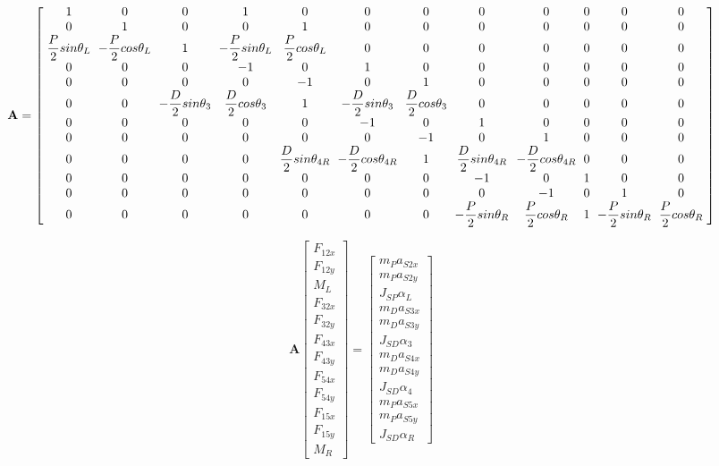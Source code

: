 \documentclass[12pt]{article}
\begin{document}
\scriptsize
\begin{equation}
\textbf{A}=
\begingroup %
\setlength\arraycolsep{3pt}
\left[
\begin{array}{cccccccccccc}
1 & 0 & 0 & 1 & 0 & 0 & 0 & 0 & 0 & 0 & 0 & 0 \\
0 & 1 & 0 & 0 & 1 & 0 & 0 & 0 & 0 & 0 & 0 & 0 \\
\dfrac{P}{2}sin\theta_L & -\dfrac{P}{2}cos\theta_L & 1 & -\dfrac{P}{2}sin\theta_L & \dfrac{P}{2}cos\theta_L & 0 & 0 & 0 & 0 & 0 & 0 & 0 \\
0 & 0 & 0 & -1 & 0 & 1 & 0 & 0 & 0 & 0 & 0 & 0 \\
0 & 0 & 0 & 0 & -1 & 0 & 1 & 0 & 0 & 0 & 0 & 0 \\
0 & 0 & -\dfrac{D}{2}sin\theta_3 & \dfrac{D}{2}cos\theta_3 & 1 & -\dfrac{D}{2}sin\theta_3 & \dfrac{D}{2}cos\theta_3 & 0 & 0 & 0 & 0 & 0 \\
0 & 0 & 0 & 0 & 0 & -1 & 0 & 1 & 0 & 0 & 0 & 0 \\
0 & 0 & 0 & 0 & 0 & 0 & -1 & 0 & 1 & 0 & 0 & 0 \\
0 & 0 & 0 & 0 & \dfrac{D}{2}sin\theta_{4R} & -\dfrac{D}{2}cos\theta_{4R} & 1 & \dfrac{D}{2}sin\theta_{4R} & -\dfrac{D}{2}cos\theta_{4R} & 0 & 0 & 0 \\
0 & 0 & 0 & 0 & 0 & 0 & 0 & -1 & 0 & 1 & 0 & 0 \\
0 & 0 & 0 & 0 & 0 & 0 & 0 & 0 & -1 & 0 & 1 & 0 \\
0 & 0 & 0 & 0 & 0 & 0 & 0 & -\dfrac{P}{2}sin\theta_R & \dfrac{P}{2}cos\theta_R & 1 & -\dfrac{P}{2}sin\theta_R & \dfrac{P}{2}cos\theta_R
\end{array}
\right]
\endgroup
\end{equation}
\normalsize

\begin{equation}
\textbf{A}
\begin{bmatrix}
F_{12x}\\
F_{12y}\\
M_L\\
F_{32x}\\
F_{32y}\\
F_{43x}\\
F_{43y}\\
F_{54x}\\
F_{54y}\\
F_{15x}\\
F_{15y}\\
M_R
\end{bmatrix}
=
\begin{bmatrix}
m_Pa_{S2x}\\
m_Pa_{S2y}\\
J_{SP}\alpha_L\\
m_Da_{S3x}\\
m_Da_{S3y}\\
J_{SD}\alpha_3\\
m_Da_{S4x}\\
m_Da_{S4y}\\
J_{SD}\alpha_4\\
m_Pa_{S5x}\\
m_Pa_{S5y}\\
J_{SD}\alpha_R
\end{bmatrix}
\end{equation}
\end{document}
